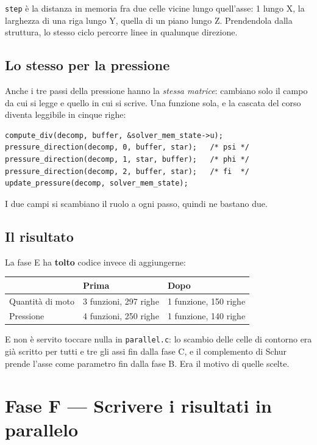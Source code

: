 \documentclass[11pt,a4paper]{article}
\newcommand{\cd}[1]{\texttt{\small #1}}
\begin{document}
\cd{step} è la distanza in memoria fra due celle vicine lungo quell'asse: 1
lungo X, la larghezza di una riga lungo Y, quella di un piano lungo Z. Prendendola
dalla struttura, lo stesso ciclo percorre linee in qualunque direzione.

\subsection*{Lo stesso per la pressione}

Anche i tre passi della pressione hanno la \emph{stessa matrice}: cambiano solo
il campo da cui si legge e quello in cui si scrive. Una funzione sola, e la
cascata del corso diventa leggibile in cinque righe:

\begin{lstlisting}
compute_div(decomp, buffer, &solver_mem_state->u);
pressure_direction(decomp, 0, buffer, star);   /* psi */
pressure_direction(decomp, 1, star, buffer);   /* phi */
pressure_direction(decomp, 2, buffer, star);   /* fi  */
update_pressure(decomp, solver_mem_state);
\end{lstlisting}

I due campi si scambiano il ruolo a ogni passo, quindi ne bastano due.

\subsection*{Il risultato}

La fase E ha \textbf{tolto} codice invece di aggiungerne:

\begin{center}
\begin{tabular}{@{}L{5cm}L{4.4cm}L{4.4cm}@{}}
\toprule
& \textbf{Prima} & \textbf{Dopo} \\
\midrule
Quantità di moto & 3 funzioni, 297 righe & 1 funzione, 150 righe \\
Pressione & 4 funzioni, 250 righe & 1 funzione, 140 righe \\
\bottomrule
\end{tabular}
\end{center}

\medskip
E non è servito toccare nulla in \cd{parallel.c}: lo scambio delle celle di
contorno era già scritto per tutti e tre gli assi fin dalla fase C, e il
complemento di Schur prende l'asse come parametro fin dalla fase B. Era il
motivo di quelle scelte.

\section{Fase F --- Scrivere i risultati in parallelo}
\end{document}
